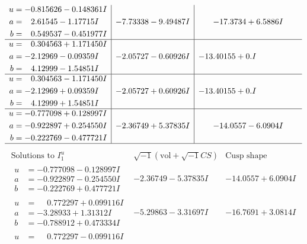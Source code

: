 \documentclass[1p]{elsarticle_modified}
\theoremstyle{definition}
\newcommand{\I}{\sqrt{-1}}
\begin{document}
$$\begin{array}{c|c|c}
\begin{aligned}
u &= -0.815626 - 0.148361 I \\
a &= \phantom{-}2.61545 - 1.17715 I \\
b &= \phantom{-}0.549537 - 0.451977 I\end{aligned}
 & -7.73338 - 9.49487 I & -17.3734 + 6.5886 I \\ \hline\begin{aligned}
u &= \phantom{-}0.304563 + 1.171450 I \\
a &= -2.12969 - 0.09359 I \\
b &= \phantom{-}4.12999 - 1.54851 I\end{aligned}
 & -2.05727 - 0.60926 I & -13.40155 + 0. I\phantom{ +0.000000I} \\ \hline\begin{aligned}
u &= \phantom{-}0.304563 - 1.171450 I \\
a &= -2.12969 + 0.09359 I \\
b &= \phantom{-}4.12999 + 1.54851 I\end{aligned}
 & -2.05727 + 0.60926 I & -13.40155 + 0. I\phantom{ +0.000000I} \\ \hline\begin{aligned}
u &= -0.777098 + 0.128997 I \\
a &= -0.922897 + 0.254550 I \\
b &= -0.222769 - 0.477721 I\end{aligned}
 & -2.36749 + 5.37835 I & -14.0557 - 6.0904 I\\
 \hline 
 \end{array}$$\newpage$$\begin{array}{c|c|c}  
\text{Solutions to }I^u_{1}& \I (\text{vol} + \sqrt{-1}CS) & \text{Cusp shape}\\
 \hline 
\begin{aligned}
u &= -0.777098 - 0.128997 I \\
a &= -0.922897 - 0.254550 I \\
b &= -0.222769 + 0.477721 I\end{aligned}
 & -2.36749 - 5.37835 I & -14.0557 + 6.0904 I \\ \hline\begin{aligned}
u &= \phantom{-}0.772297 + 0.099116 I \\
a &= -3.28933 + 1.31312 I \\
b &= -0.788912 + 0.473334 I\end{aligned}
 & -5.29863 - 3.31697 I & -16.7691 + 3.0814 I \\ \hline\begin{aligned}
u &= \phantom{-}0.772297 - 0.099116 I \\

\end{aligned}
\end{array}$$
\end{document}
